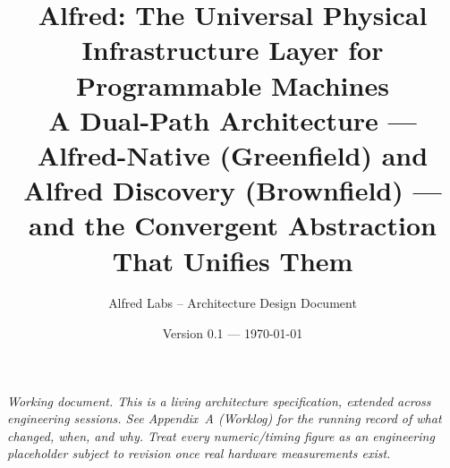 \documentclass[11pt]{article}
\title{\vspace{-2cm}\textcolor{alfrednavy}{\Huge\bfseries Alfred: The Universal Physical\\Infrastructure Layer for Programmable Machines}\\[0.6em]
\large\textcolor{alfredsteel}{A Dual-Path Architecture --- Alfred-Native (Greenfield) and Alfred Discovery (Brownfield) --- \\and the Convergent Abstraction That Unifies Them}}
\author{Alfred Labs -- Architecture Design Document}
\date{Version 0.1 --- \today}
\begin{document}
\maketitle
\thispagestyle{empty}

\begin{center}
\begin{minipage}{0.85\linewidth}
\small
\textit{Working document. This is a living architecture specification, extended across engineering sessions. See Appendix~A (Worklog) for the running record of what changed, when, and why. Treat every numeric/timing figure as an engineering placeholder subject to revision once real hardware measurements exist.}
\end{minipage}
\end{center}
\newpage

\tableofcontents
\newpage






















\end{document}
